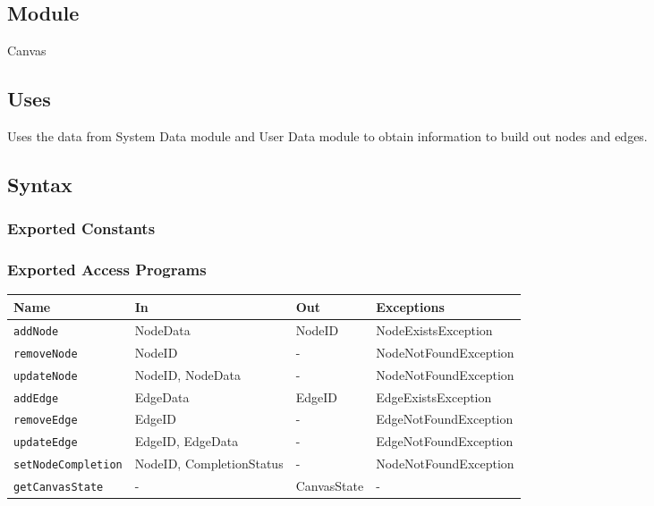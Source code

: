 \documentclass[12pt, titlepage]{article}
\begin{document}
\subsection{Module}

Canvas

\subsection{Uses}
Uses the data from System Data module and User Data module to obtain information to build out nodes and edges.

\subsection{Syntax}

\subsubsection{Exported Constants}

\subsubsection{Exported Access Programs}

\begin{center} \begin{tabular}{|p{4cm}|p{4cm}|p{2.5cm}|p{5cm}|} \hline \textbf{Name} & \textbf{In} & \textbf{Out} & \textbf{Exceptions} \\ \hline \texttt{addNode} & NodeData & NodeID & NodeExistsException \\ \hline \texttt{removeNode} & NodeID & - & NodeNotFoundException \\ \hline \texttt{updateNode} & NodeID, NodeData & - & NodeNotFoundException \\ \hline \texttt{addEdge} & EdgeData & EdgeID & EdgeExistsException \\ \hline \texttt{removeEdge} & EdgeID & - & EdgeNotFoundException \\ \hline \texttt{updateEdge} & EdgeID, EdgeData & - & EdgeNotFoundException \\ \hline \texttt{setNodeCompletion} & NodeID, CompletionStatus & - & NodeNotFoundException \\ \hline \texttt{getCanvasState} & - & CanvasState & - \\ \hline \end{tabular} \end{center}
\end{document}
